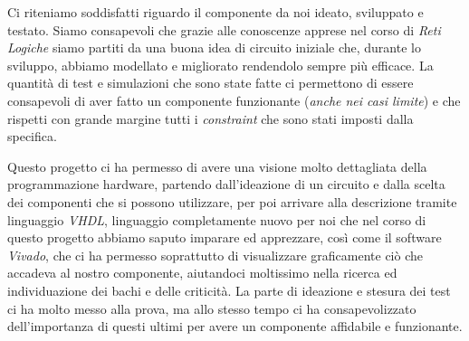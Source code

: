Ci riteniamo soddisfatti riguardo il componente da noi ideato,
sviluppato e testato. Siamo consapevoli che grazie alle conoscenze
apprese nel corso di \emph{Reti Logiche} siamo partiti da una buona idea
di circuito iniziale che, durante lo sviluppo, abbiamo modellato e
migliorato rendendolo sempre più efficace. La quantità di test e
simulazioni che sono state fatte ci permettono di essere consapevoli di
aver fatto un componente funzionante (\emph{anche nei casi limite}) e
che rispetti con grande margine tutti i \emph{constraint} che sono stati
imposti dalla specifica.

Questo progetto ci ha permesso di avere una visione molto dettagliata
della programmazione hardware, partendo dall'ideazione di un circuito e
dalla scelta dei componenti che si possono utilizzare, per poi arrivare
alla descrizione tramite linguaggio \emph{VHDL}, linguaggio
completamente nuovo per noi che nel corso di questo progetto abbiamo
saputo imparare ed apprezzare, così come il software \emph{Vivado}, che
ci ha permesso soprattutto di visualizzare graficamente ciò che accadeva
al nostro componente, aiutandoci moltissimo nella ricerca ed
individuazione dei bachi e delle criticità. La parte di ideazione e
stesura dei test ci ha molto messo alla prova, ma allo stesso tempo ci
ha consapevolizzato dell'importanza di questi ultimi per avere un
componente affidabile e funzionante.
